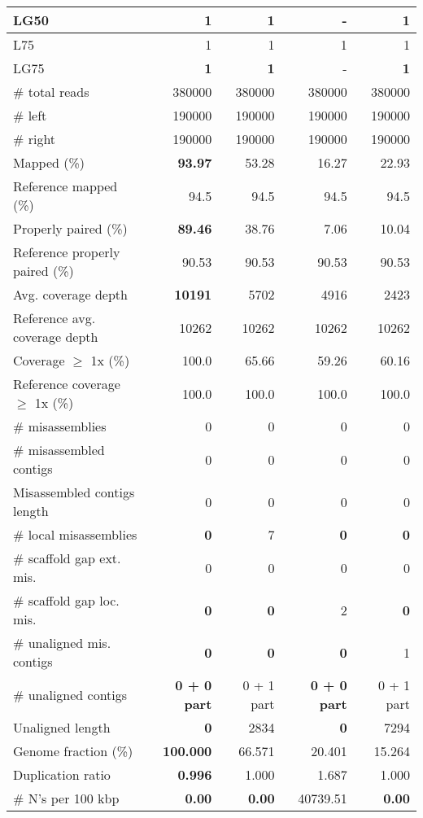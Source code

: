 \documentclass[12pt,a4paper]{article}
\begin{document}
\begin{table}[ht]
\begin{center}
\begin{tabular}{|l*{4}{|r}|}
LG50 & {\bf 1} & {\bf 1} & - & {\bf 1} \\ \hline
L75 & 1 & 1 & 1 & 1 \\ \hline
LG75 & {\bf 1} & {\bf 1} & - & {\bf 1} \\ \hline
\# total reads & 380000 & 380000 & 380000 & 380000 \\ \hline
\# left & 190000 & 190000 & 190000 & 190000 \\ \hline
\# right & 190000 & 190000 & 190000 & 190000 \\ \hline
Mapped (\%) & {\bf 93.97} & 53.28 & 16.27 & 22.93 \\ \hline
Reference mapped (\%) & 94.5 & 94.5 & 94.5 & 94.5 \\ \hline
Properly paired (\%) & {\bf 89.46} & 38.76 & 7.06 & 10.04 \\ \hline
Reference properly paired (\%) & 90.53 & 90.53 & 90.53 & 90.53 \\ \hline
Avg. coverage depth & {\bf 10191} & 5702 & 4916 & 2423 \\ \hline
Reference avg. coverage depth & 10262 & 10262 & 10262 & 10262 \\ \hline
Coverage $\geq$ 1x (\%) & 100.0 & 65.66 & 59.26 & 60.16 \\ \hline
Reference coverage $\geq$ 1x (\%) & 100.0 & 100.0 & 100.0 & 100.0 \\ \hline
\# misassemblies & 0 & 0 & 0 & 0 \\ \hline
\# misassembled contigs & 0 & 0 & 0 & 0 \\ \hline
Misassembled contigs length & 0 & 0 & 0 & 0 \\ \hline
\# local misassemblies & {\bf 0} & 7 & {\bf 0} & {\bf 0} \\ \hline
\# scaffold gap ext. mis. & 0 & 0 & 0 & 0 \\ \hline
\# scaffold gap loc. mis. & {\bf 0} & {\bf 0} & 2 & {\bf 0} \\ \hline
\# unaligned mis. contigs & {\bf 0} & {\bf 0} & {\bf 0} & 1 \\ \hline
\# unaligned contigs & {\bf 0 + 0 part} & 0 + 1 part & {\bf 0 + 0 part} & 0 + 1 part \\ \hline
Unaligned length & {\bf 0} & 2834 & {\bf 0} & 7294 \\ \hline
Genome fraction (\%) & {\bf 100.000} & 66.571 & 20.401 & 15.264 \\ \hline
Duplication ratio & {\bf 0.996} & 1.000 & 1.687 & 1.000 \\ \hline
\# N's per 100 kbp & {\bf 0.00} & {\bf 0.00} & 40739.51 & {\bf 0.00} \\ \hline

\end{tabular}
\end{center}
\end{table}
\end{document}
